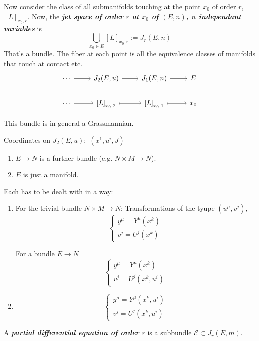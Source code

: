Now consider the class of all submanifolds touching at the point $x_0$ of order $r$, $[L]_{x_0,r}$. Now, the \textit{\textbf{jet space of order $r$ at $x_0$ of $(E,n)$, $n$ independant variables}} is
\[\bigcup_{x_0 \in E}[L]_{x_0,r}:=J_r(E,n) \]
That's a bundle. The fiber at each point is all the equivalence classes of manifolds that touch at contact etc.
\[\begin{tikzcd}
	\cdots \arrow[r]&J_2(E,u)\arrow[r]& J_1(E,n) \arrow[ r] & E\\
	\cdots \arrow[ r ]&  \left[L\right]_{x_0,2}\arrow[r, maps to] &  \left[L\right]_{x_0,1}\arrow[r,maps to]& x_0
\end{tikzcd}\]

\begin{remark}\leavevmode
	This bundle is in general a Grassmannian.
\end{remark}

Coordinates on $J_2(E,u):$ $(x^1,u^i,J)$
\begin{enumerate}
\item $E \to N$ is a further bundle (e.g.  $N\times M \to N$).
\item $E$ is just a  manifold.
\end{enumerate}

Each has to be dealt with in a way:
\begin{enumerate}
\item For the trivial bundle $N\times M \to N$: Transformations of the tyupe $(u^\mu,v^j)$,
	\[\begin{cases}
		y^\mu=Y^\mu(x^k) \\
		v^j=U^j(x^k)
	\end{cases}\]

For a bundle $E \to N$ 
\[\begin{cases}
		y^\mu=Y^\mu(x^k) \\
		v^j=U^j(x^k, u^i)
	\end{cases}\]

\item 
	\[\begin{cases}
		y^\mu=Y^\mu(x^k,u^i) \\
		v^j=U^j(x^k,u^i)
	\end{cases}\]
\end{enumerate}

\begin{defn}\leavevmode
	A \textit{\textbf{partial differential equation of order $r$}} is a subbundle $\mathcal{E}\subset J_r(E,m)$.
\end{defn}

